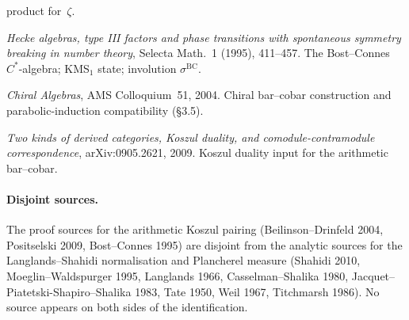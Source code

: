 \begin{description}
product for~\(\zeta\).
\item[Bost, J.-B. and Connes, A.] \emph{Hecke algebras, type III
factors and phase transitions with spontaneous symmetry breaking
in number theory}, Selecta Math.~1 (1995), 411--457. The
Bost--Connes \(C^{*}\)-algebra; KMS\({}_{1}\) state; involution
\(\sigma^{\mathrm{BC}}\).
\item[Beilinson, A. and Drinfeld, V.] \emph{Chiral Algebras}, AMS
Colloquium~51, 2004. Chiral bar--cobar construction and
parabolic-induction compatibility (\S3.5).
\item[Positselski, L.] \emph{Two kinds of derived categories,
Koszul duality, and comodule-contramodule correspondence},
arXiv:0905.2621, 2009. Koszul duality input for the arithmetic
bar--cobar.
\end{description}

\paragraph{Disjoint sources.}
The proof sources for the arithmetic Koszul pairing
(Beilinson--Drinfeld 2004, Positselski 2009, Bost--Connes 1995)
are disjoint from the analytic sources for the
Langlands--Shahidi normalisation and Plancherel measure
(Shahidi 2010, Moeglin--Waldspurger 1995, Langlands 1966,
Casselman--Shalika 1980, Jacquet--Piatetski-Shapiro--Shalika
1983, Tate 1950, Weil 1967, Titchmarsh 1986). No source appears
on both sides of the identification.
